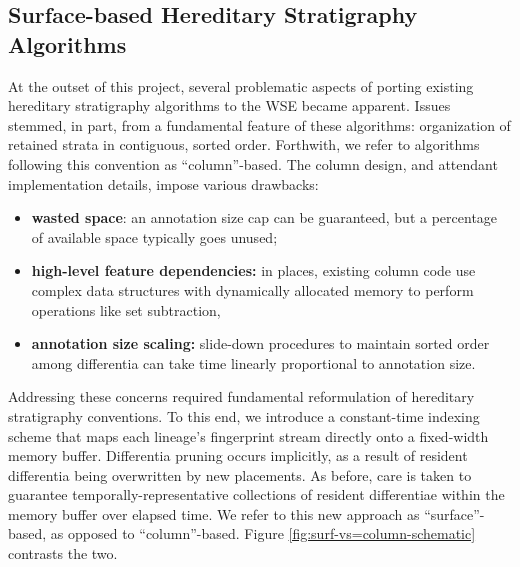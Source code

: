 \subsection{Surface-based Hereditary Stratigraphy Algorithms}

At the outset of this project, several problematic aspects of porting existing hereditary stratigraphy algorithms to the WSE became apparent.
Issues stemmed, in part, from a fundamental feature of these algorithms: organization of retained strata in contiguous, sorted order.
Forthwith, we refer to algorithms following this convention as ``column''-based.
The column design, and attendant implementation details, impose various drawbacks:
\begin{itemize}
\item \textbf{wasted space}: an annotation size cap can be guaranteed, but a percentage of available space typically goes unused;
\item \textbf{high-level feature dependencies:} in places, existing column code use complex data structures with dynamically allocated memory to perform operations like set subtraction,
\item \textbf{annotation size scaling:} slide-down procedures to maintain sorted order among differentia can take time linearly proportional to annotation size.
\end{itemize}



Addressing these concerns required fundamental reformulation of hereditary stratigraphy conventions.
To this end, we introduce a constant-time indexing scheme that maps each lineage's fingerprint stream directly onto a fixed-width memory buffer.
Differentia pruning occurs implicitly, as a result of resident differentia being overwritten by new placements.
As before, care is taken to guarantee temporally-representative collections of resident differentiae within the memory buffer over elapsed time.
We refer to this new approach as ``surface''-based, as opposed to ``column''-based.
Figure \ref{fig:surf-vs=column-schematic} contrasts the two.




